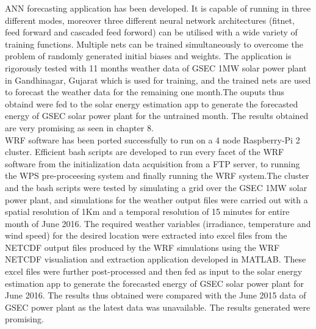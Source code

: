 ANN forecasting application has been developed. It is capable of running in three different modes, moreover three different neural network architectures (fitnet, feed forward and cascaded feed forword) can be utilised with a wide variety of training functions. Multiple nets can be trained simultaneously to overcome the problem of randomly generated initial biases and weights. The application is rigorously tested with 11 months weather data of GSEC 1MW solar power plant in Gandhinagar, Gujarat
 which is used for training, and the trained nets are used to forecast the weather data for the remaining one month.The ouputs thus obtaind were fed to the solar energy estimation app to generate the forecasted energy of GSEC solar power plant for the untrained month. The results obtained are very promising as seen in chapter 8.\\

WRF software has been ported successfully to run on a 4 node Raspberry-Pi 2 cluster. Efficient bash scripts are developed to run every facet of the WRF software from the initialization data acquisition from a FTP server, to running the WPS pre-proceesing system and finally running the WRF system.The cluster and the bash scripts were tested by simulating a grid over the GSEC 1MW solar power plant, and simulations for the weather output files were carried out with a spatial resolution of 1Km and a temporal resolution of 15 minutes for entire month of June 2016. The required weather variables (irradiance, temperature and wind speed) for the desired location were extracted into excel files from the NETCDF output files produced by the WRF simulations using the WRF NETCDF visualiation and extraction application developed in MATLAB. These excel files were further post-processed and then fed as input to the solar energy estimation app to generate the forecasted energy of GSEC solar power plant for June 2016. The results thus obtained were compared with the June 2015 data of GSEC power plant as the latest data was unavailable. The results generated were promising.\\

